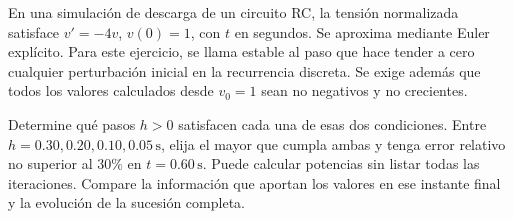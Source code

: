 En una simulación de descarga de un circuito RC, la tensión normalizada satisface \(v'=-4v\), \(v(0)=1\), con \(t\) en segundos. Se aproxima mediante Euler explícito. Para este ejercicio, se llama estable al paso que hace tender a cero cualquier perturbación inicial en la recurrencia discreta. Se exige además que todos los valores calculados desde \(v_0=1\) sean no negativos y no crecientes.

Determine qué pasos \(h>0\) satisfacen cada una de esas dos condiciones. Entre \(h=0.30,0.20,0.10,0.05\,\mathrm s\), elija el mayor que cumpla ambas y tenga error relativo no superior al \(30\%\) en \(t=0.60\,\mathrm s\). Puede calcular potencias sin listar todas las iteraciones. Compare la información que aportan los valores en ese instante final y la evolución de la sucesión completa.
